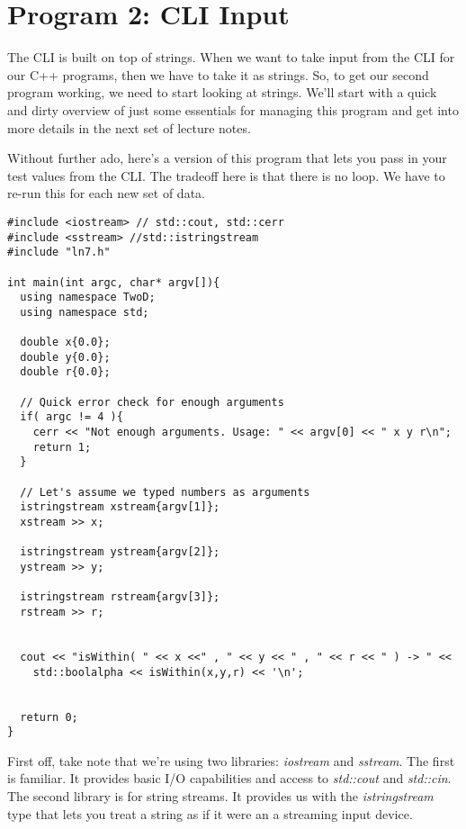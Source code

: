 \documentclass[]{tufte-handout}
\begin{document}
\section{Program 2: CLI Input}

The CLI is built on top of strings. When we want to take input from the CLI for our C++ programs, then we have to take it as strings.  So, to get our second program working, we need to start looking at strings. We'll start with a quick and dirty overview of just some essentials for managing this program and get into more details in the next set of lecture notes.

Without further ado, here's a version of this program that lets you pass in your test values from the CLI. The tradeoff here is that there is no loop. We have to re-run this for each new set of data.
\begin{verbatim}
#include <iostream> // std::cout, std::cerr
#include <sstream> //std::istringstream
#include "ln7.h"

int main(int argc, char* argv[]){
  using namespace TwoD;
  using namespace std;

  double x{0.0};
  double y{0.0};
  double r{0.0};

  // Quick error check for enough arguments
  if( argc != 4 ){
    cerr << "Not enough arguments. Usage: " << argv[0] << " x y r\n";
    return 1;
  }

  // Let's assume we typed numbers as arguments
  istringstream xstream{argv[1]};
  xstream >> x;

  istringstream ystream{argv[2]};
  ystream >> y;

  istringstream rstream{argv[3]};
  rstream >> r;


  cout << "isWithin( " << x <<" , " << y << " , " << r << " ) -> " <<
    std::boolalpha << isWithin(x,y,r) << '\n';


  return 0;
}
\end{verbatim}

First off, take note that we're using two libraries: \textit{iostream} and \textit{sstream}. The first is familiar. It provides basic I/O capabilities and access to \textit{std::cout} and \textit{std::cin}. The second library is for string streams. It provides us with the \textit{istringstream} type that lets you treat a string as if it were an a streaming input device.  
\end{document}
